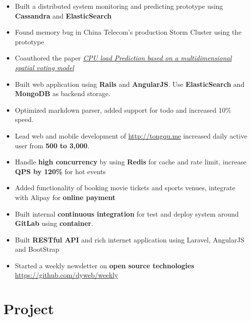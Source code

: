 \documentclass[10pt, letterpaper]{simple-cv}
\begin{document}
\begin{itemize}
\item Built a distributed system monitoring and predicting prototype using \textbf{Cassandra} and \textbf{ElasticSearch}
\item Found memory bug in China Telecom's production Storm Cluster using the prototype
\item Coauthored the paper \textit{\href{https://at15.github.io/pub/cpu_load_prediction.pdf}{CPU load Prediction based on a multidimensional spatial voting model}}
\end{itemize}

\begin{itemize}
\item Built web application using \textbf{Rails} and \textbf{AngularJS}. Use \textbf{ElasticSearch} and \textbf{MongoDB} as backend storage.
\item Optimized markdown parser, added support for todo and increased 10\% speed.
\end{itemize}

\begin{itemize}
\item Lead web and mobile development of \url{http://tongqu.me} increased daily active user from \textbf{500 to 3,000}.
\item Handle \textbf{high concurrency} by using \textbf{Redis} for cache and rate limit, increase \textbf{QPS by 120\%} for hot events
\item Added functionality of booking movie tickets and sports venues, integrate with Alipay for \textbf{online payment}
\item Built internal \textbf{continuous integration} for test and deploy system around \textbf{GitLab} using \textbf{container}.
\item Built \textbf{RESTful API} and rich internet application using Laravel, AngularJS and BootStrap
\item Started a weekly newsletter on \textbf{open source technologies} \url{https://github.com/dyweb/weekly}
\end{itemize}

\section{Project}
\end{document}
